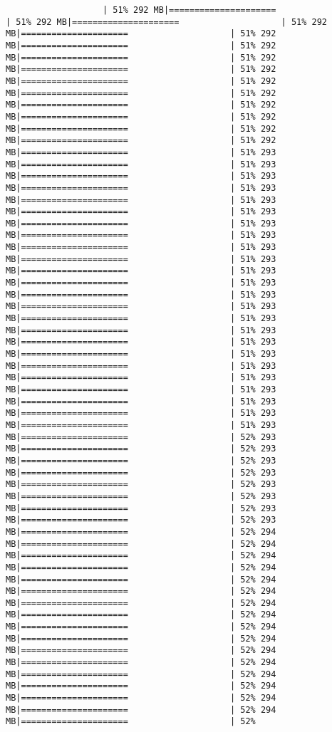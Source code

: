 \documentclass[
]{article}
\begin{document}
\begin{verbatim}
                   | 51% 292 MB|=====================                    | 51% 292 MB|=====================                    | 51% 292 MB|=====================                    | 51% 292 MB|=====================                    | 51% 292 MB|=====================                    | 51% 292 MB|=====================                    | 51% 292 MB|=====================                    | 51% 292 MB|=====================                    | 51% 292 MB|=====================                    | 51% 292 MB|=====================                    | 51% 292 MB|=====================                    | 51% 292 MB|=====================                    | 51% 292 MB|=====================                    | 51% 293 MB|=====================                    | 51% 293 MB|=====================                    | 51% 293 MB|=====================                    | 51% 293 MB|=====================                    | 51% 293 MB|=====================                    | 51% 293 MB|=====================                    | 51% 293 MB|=====================                    | 51% 293 MB|=====================                    | 51% 293 MB|=====================                    | 51% 293 MB|=====================                    | 51% 293 MB|=====================                    | 51% 293 MB|=====================                    | 51% 293 MB|=====================                    | 51% 293 MB|=====================                    | 51% 293 MB|=====================                    | 51% 293 MB|=====================                    | 51% 293 MB|=====================                    | 51% 293 MB|=====================                    | 51% 293 MB|=====================                    | 51% 293 MB|=====================                    | 51% 293 MB|=====================                    | 51% 293 MB|=====================                    | 51% 293 MB|=====================                    | 51% 293 MB|=====================                    | 52% 293 MB|=====================                    | 52% 293 MB|=====================                    | 52% 293 MB|=====================                    | 52% 293 MB|=====================                    | 52% 293 MB|=====================                    | 52% 293 MB|=====================                    | 52% 293 MB|=====================                    | 52% 293 MB|=====================                    | 52% 294 MB|=====================                    | 52% 294 MB|=====================                    | 52% 294 MB|=====================                    | 52% 294 MB|=====================                    | 52% 294 MB|=====================                    | 52% 294 MB|=====================                    | 52% 294 MB|=====================                    | 52% 294 MB|=====================                    | 52% 294 MB|=====================                    | 52% 294 MB|=====================                    | 52% 294 MB|=====================                    | 52% 294 MB|=====================                    | 52% 294 MB|=====================                    | 52% 294 MB|=====================                    | 52% 294 MB|=====================                    | 52% 294 MB|=====================                    | 52% 
\end{verbatim}
\end{document}
